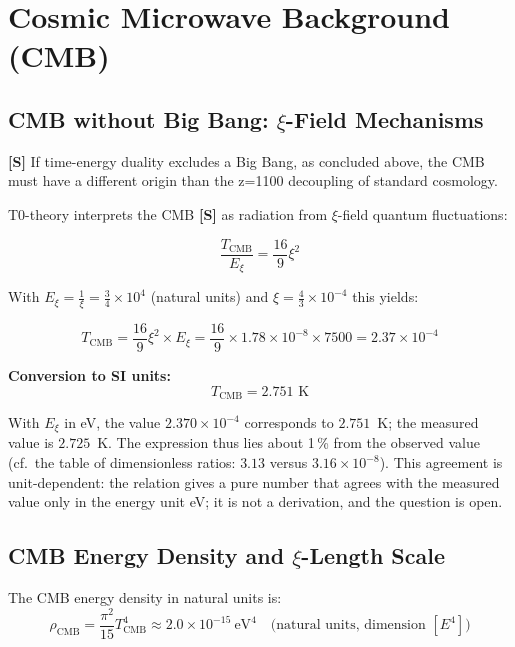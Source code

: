 	\section{Cosmic Microwave Background (CMB)}
	
	\subsection{CMB without Big Bang: $\xi$-Field Mechanisms}
	
	\begin{revolutionary}[Thesis]
		\textbf{[S]} If time-energy duality excludes a Big Bang, as concluded above, the CMB must have a different origin than the z=1100 decoupling of standard cosmology.
	\end{revolutionary}
	
	T0-theory interprets the CMB \textbf{[S]} as radiation from $\xi$-field quantum fluctuations:
	
	\begin{equation}
		\frac{T_{\text{CMB}}}{E_\xi} = \frac{16}{9} \xi^2
	\end{equation}
	
	With $E_\xi = \frac{1}{\xi} = \frac{3}{4} \times 10^4$ (natural units) and $\xi = \frac{4}{3} \times 10^{-4}$ this yields:
	
	\begin{equation}
		T_{\text{CMB}} = \frac{16}{9} \xi^2 \times E_\xi = \frac{16}{9} \times 1.78 \times 10^{-8} \times 7500 = 2.37 \times 10^{-4}
	\end{equation}
	
	\textbf{Conversion to SI units:}
	\begin{equation}
		T_{\text{CMB}} = 2.751 \text{ K}
	\end{equation}
	
	With $E_\xi$ in eV, the value $2.370\times10^{-4}$ corresponds to $2.751$~K; the measured value is $2.725$~K. The expression thus lies about 1\,\% from the observed value (cf.\ the table of dimensionless ratios: $3.13$ versus $3.16 \times 10^{-8}$). This agreement is unit-dependent: the relation gives a pure number that agrees with the measured value only in the energy unit eV; it is not a derivation, and the question is open.
	
	\subsection{CMB Energy Density and $\xi$-Length Scale}
	
	The CMB energy density in natural units is:
	\begin{equation}
		\rho_{\text{CMB}} = \frac{\pi^2}{15}T_{\text{CMB}}^4 \approx 2.0 \times 10^{-15}\ \text{eV}^4 \quad \text{(natural units, dimension } [E^4] \text{)}
	\end{equation}
	
